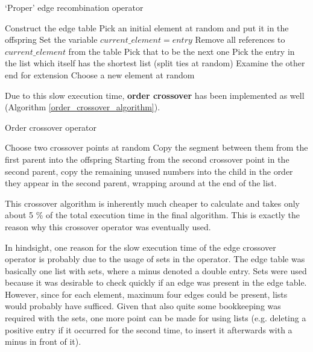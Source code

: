 \documentclass[a4paper,10pt]{article}
\begin{document}
\begin{algorithm}
\caption{`Proper' edge recombination operator \cite{eiben_smith}}\label{proper_edge_crossover}
\begin{algorithmic}
\State Construct the edge table
\State Pick an initial element at random and put it in the offspring
\State Set the variable $current\_element = entry$
\State Remove all references to $current\_element$ from the table
\State Pick that to be the next one
\Else
\State Pick the entry in the list which itself has the shortest list (split ties at random)
\EndIf
{}
\State Examine the other end for extension
\Else
\State Choose a new element at random
\EndIf
\EndIf
\EndWhile
\end{algorithmic}
\end{algorithm}

Due to this slow execution time, \textbf{order crossover} \cite{eiben_smith} has been implemented as well (Algorithm \ref{order_crossover_algorithm}).

\begin{algorithm}
\caption{Order crossover operator \cite{eiben_smith}}\label{order_crossover_algorithm}
\begin{algorithmic}
\State Choose two crossover points at random
\State Copy the segment between them from the first parent into the offspring
\State Starting from the second crossover point in the second parent, copy the remaining unused numbers into the child in the order they appear in the second parent, wrapping around at the end of the list.
\end{algorithmic}
\end{algorithm}

This crossover algorithm is inherently much cheaper to calculate and takes only about 5 \% of the total execution time in the final algorithm. This is exactly the reason why this crossover operator was eventually used. 

In hindsight, one reason for the slow execution time of the edge crossover operator is probably due to the usage of sets in the operator. The edge table was basically one list with sets, where a minus denoted a double entry. Sets were used because it was desirable to check quickly if an edge was present in the edge table. However, since for each element, maximum four edges could be present, lists would probably have sufficed. Given that also quite some bookkeeping was required with the sets, one more point can be made for using lists (e.g. deleting a positive entry if it occurred for the second time, to insert it afterwards with a minus in front of it). 
\end{document}
